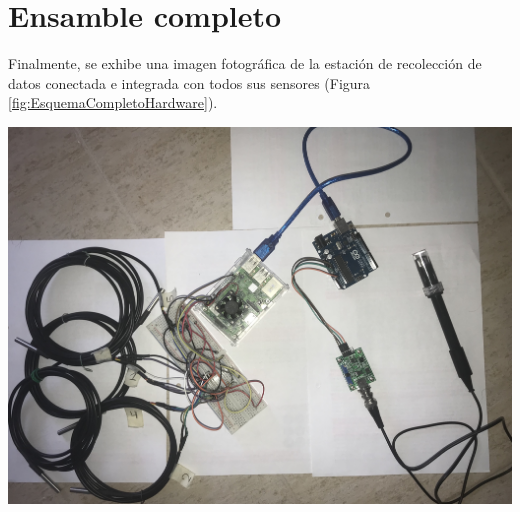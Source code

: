 \section{Ensamble completo}
\begin{minipage}{0.95 \textwidth}
    \par Finalmente, se exhibe una imagen fotográfica de la estación de recolección de datos conectada e integrada con todos sus sensores (Figura \ref{fig:EsquemaCompletoHardware}).\\ 
\end{minipage}
\begin{minipage}{0.95 \textwidth}
    
        \centering
        \includegraphics[scale=0.1]{hardware/SistemaEnsamblado.jpeg}
        \label{fig:EsquemaCompletoHardware}
    
\end{minipage}